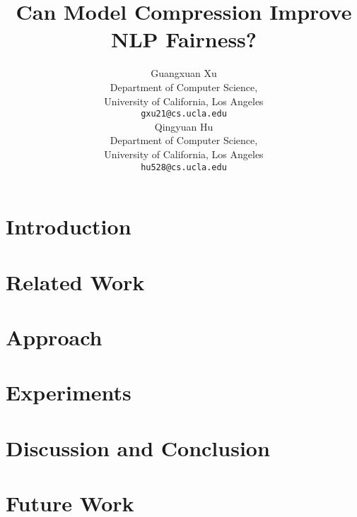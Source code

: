 \documentclass[11pt]{article}
\title{Can Model Compression Improve NLP Fairness?}
\author{Guangxuan Xu \\
  Department of Computer Science,\\
  University of California, Los Angeles\\
  \texttt{gxu21@cs.ucla.edu} \\\And
  Qingyuan Hu \\
  Department of Computer Science,\\
  University of California, Los Angeles\\
  \texttt{hu528@cs.ucla.edu} \\}
\begin{document}
\maketitle

\begin{abstract}
    
\end{abstract}

\section{Introduction}



\section{Related Work}



\section{Approach}



\section{Experiments}



\section{Discussion and Conclusion}



\section{Future Work}


\newpage



\appendix

% 
\end{document}
